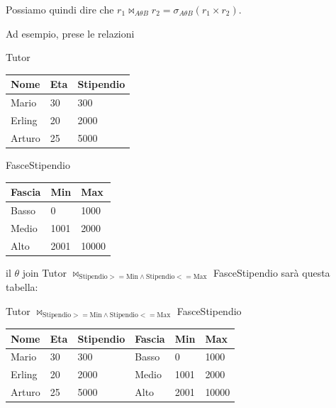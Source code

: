\documentclass[11pt, a4paper, titlepage, oneside]{scrbook}
\begin{document}
Possiamo quindi dire che $r_1 \bowtie_{A \theta B} r_2 = \sigma_{A \theta B}(r_1 \times r_2)$.

Ad esempio, prese le relazioni

\begin{minipage}[c]{0.45\textwidth}
\begin{center}
    Tutor

\begin{tabular}{|l|l|l|}
\hline
\textbf{Nome} & \textbf{Eta} & \textbf{Stipendio} \\ \hline
Mario & 30 & 300 \\
Erling & 20 & 2000 \\
Arturo & 25 & 5000 \\ \hline
\end{tabular}
\end{center}
\end{minipage}\hfill
\begin{minipage}[c]{0.45\textwidth}
\begin{center}
    FasceStipendio

\begin{tabular}{|l|l|l|}
\hline
\textbf{Fascia} & \textbf{Min} & \textbf{Max} \\ \hline
Basso & 0 & 1000 \\
Medio & 1001 & 2000 \\
Alto & 2001 & 10000 \\ \hline
\end{tabular}
\end{center}
\end{minipage}

il $\theta$ join Tutor $\bowtie_{\text{Stipendio} >= \text{Min} \land \text{Stipendio} <= \text{Max}}$ FasceStipendio sarà questa tabella:

\begin{center}
Tutor $\bowtie_{\text{Stipendio} >= \text{Min} \land \text{Stipendio} <= \text{Max}}$ FasceStipendio \nopagebreak

\begin{tabular}{|l|l|l|l|l|l|}
\hline
\textbf{Nome} & \textbf{Eta} & \textbf{Stipendio} & \textbf{Fascia} & \textbf{Min} & \textbf{Max} \\ \hline
Mario & 30 & 300 & Basso & 0 & 1000 \\
Erling & 20 & 2000 & Medio & 1001 & 2000 \\
Arturo & 25 &  5000 & Alto & 2001 & 10000 \\ \hline
\end{tabular}
\end{center}
\end{document}

